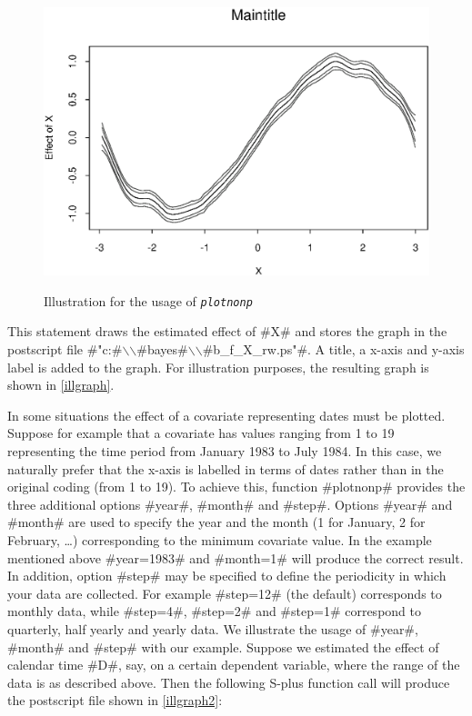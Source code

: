 \begin{figure}[ht]
\begin{center}
\includegraphics[scale=0.8]{grafiken/plotnonp.eps}
{\em\caption{ \label{illgraph} Illustration for the usage of
\em\tt plotnonp}}
\end{center}
\end{figure}

This statement draws the estimated effect of #X# and stores the
graph in the postscript file
#"c:#$\backslash$$\backslash$#bayes#$\backslash$$\backslash$#b_f_X_rw.ps"#.
A title, a x-axis and y-axis label is added to the graph. For
illustration purposes, the resulting graph is shown in
\autoref{illgraph}.

In some situations the effect of a covariate representing dates
must be plotted. Suppose for example that a covariate has values
ranging from 1 to 19 representing the time period from January
1983 to July 1984. In this case, we naturally prefer that the
x-axis is labelled in terms of dates rather than in the original
coding (from 1 to 19). To achieve this, function #plotnonp#
provides the three additional options #year#, #month# and #step#.
Options #year# and #month# are used to specify the year and the
month (1 for January, 2 for February, \dots) corresponding to the
minimum covariate value. In the example mentioned above
#year=1983# and #month=1# will produce the correct result. In
addition, option #step# may be specified to define the periodicity
in which your data are collected. For example #step=12# (the
default) corresponds to monthly data, while #step=4#, #step=2# and
#step=1# correspond to quarterly, half yearly and yearly data. We
illustrate the usage of #year#, #month# and #step# with our
example. Suppose we estimated the effect of calendar time #D#,
say, on a certain dependent variable, where the range of the data
is as described above. Then the following S-plus function call
will produce the postscript file shown in \autoref{illgraph2}:

